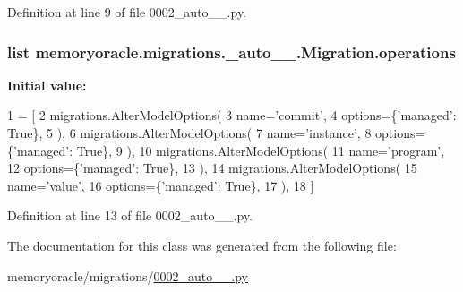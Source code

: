 Definition at line 9 of file 0002\+\_\+auto\+\_\+\_.\+py.

\hypertarget{classmemoryoracle_1_1migrations_1_10002__auto__20150303__0042_1_1Migration_a8a910eb544f4f1fbc91f5b04a0d84bbd}{}
\subsubsection[{operations}]{\setlength{\rightskip}{0pt plus 5cm}list memoryoracle.\+migrations.\+\_\+auto\+\_\+\_.\+Migration.\+operations\hspace{0.3cm}{\ttfamily [static]}}\label{classmemoryoracle_1_1migrations_1_10002__auto__20150303__0042_1_1Migration_a8a910eb544f4f1fbc91f5b04a0d84bbd}
{\bfseries Initial value\+:}
\begin{DoxyCode}
1 = [
2         migrations.AlterModelOptions(
3             name=\textcolor{stringliteral}{'commit'},
4             options=\{\textcolor{stringliteral}{'managed'}: \textcolor{keyword}{True}\},
5         ),
6         migrations.AlterModelOptions(
7             name=\textcolor{stringliteral}{'instance'},
8             options=\{\textcolor{stringliteral}{'managed'}: \textcolor{keyword}{True}\},
9         ),
10         migrations.AlterModelOptions(
11             name=\textcolor{stringliteral}{'program'},
12             options=\{\textcolor{stringliteral}{'managed'}: \textcolor{keyword}{True}\},
13         ),
14         migrations.AlterModelOptions(
15             name=\textcolor{stringliteral}{'value'},
16             options=\{\textcolor{stringliteral}{'managed'}: \textcolor{keyword}{True}\},
17         ),
18     ]
\end{DoxyCode}


Definition at line 13 of file 0002\+\_\+auto\+\_\+\_.\+py.



The documentation for this class was generated from the following file\+:\begin{DoxyCompactItemize}
\item 
memoryoracle/migrations/\hyperlink{0002__auto__20150303__0042_8py}{0002\+\_\+auto\+\_\+\_.\+py}\end{DoxyCompactItemize}
